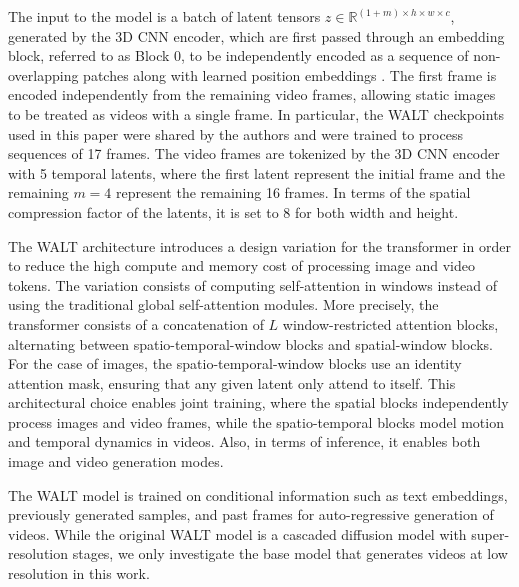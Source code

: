 The input to the model is a batch of latent tensors $ z \in \mathbb{R}^{(1+m)\times h \times w \times c} $, generated by the 3D CNN encoder, which are first passed through an embedding block, referred to as Block 0, to be independently encoded as a sequence of non-overlapping patches along with learned position embeddings \cite{AttentionIsAllYouNeed}.
The first frame is encoded independently from the remaining video frames, allowing static images to be treated as videos with a single frame. In particular, the WALT checkpoints used in this paper were shared by the authors and were trained to process sequences of 17 frames.  The video frames are tokenized by the 3D CNN encoder with 5 temporal latents, where the first latent represent the initial frame and the remaining $m=4$ represent the remaining 16 frames. In terms of the spatial compression factor of the latents, it is set to 8 for both width and height.

The WALT architecture introduces a design variation for the transformer in order to reduce the high compute and memory cost of processing image and video tokens. The variation consists of computing self-attention in windows instead of using the traditional global self-attention modules. More precisely, the transformer consists of a concatenation of $L$ window-restricted attention blocks, alternating between spatio-temporal-window blocks and spatial-window blocks. For the case of images, the spatio-temporal-window blocks use an identity attention mask, ensuring that any given latent only attend to itself. This architectural choice enables joint training, where the spatial blocks independently process images and video frames, while the spatio-temporal blocks model motion and temporal dynamics in videos. Also, in terms of inference, it enables both image and video generation modes. 

The WALT model is trained on conditional information such as text embeddings, previously generated samples, and past frames for auto-regressive generation of videos.
While the original WALT model is a cascaded diffusion model with super-resolution stages, we only investigate the base model that generates videos at low resolution in this work.


